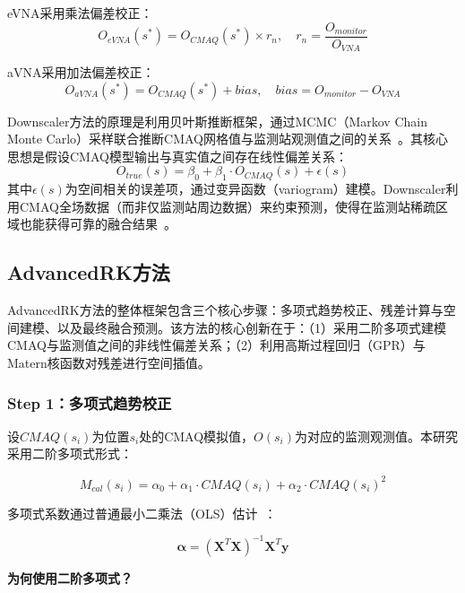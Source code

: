 \documentclass[UTF8, a4paper, 12pt]{article}
\begin{document}
eVNA采用乘法偏差校正：
\begin{equation}
O_{eVNA}(s^*) = O_{CMAQ}(s^*) \times r_n, \quad r_n = \frac{O_{monitor}}{O_{VNA}}
\end{equation}

aVNA采用加法偏差校正：
\begin{equation}
O_{aVNA}(s^*) = O_{CMAQ}(s^*) + bias, \quad bias = O_{monitor} - O_{VNA}
\end{equation}

 Downscaler方法的原理是利用贝叶斯推断框架，通过MCMC（Markov Chain Monte Carlo）采样联合推断CMAQ网格值与监测站观测值之间的关系~\cite{rodriguez2025downscaling}。其核心思想是假设CMAQ模型输出与真实值之间存在线性偏差关系：
\begin{equation}
O_{true}(s) = \beta_0 + \beta_1 \cdot O_{CMAQ}(s) + \epsilon(s)
\end{equation}
其中$\epsilon(s)$为空间相关的误差项，通过变异函数（variogram）建模。Downscaler利用CMAQ全场数据（而非仅监测站周边数据）来约束预测，使得在监测站稀疏区域也能获得可靠的融合结果~\cite{foley2010CMAQ}。

\subsection{AdvancedRK方法}

AdvancedRK方法的整体框架包含三个核心步骤：多项式趋势校正、残差计算与空间建模、以及最终融合预测。该方法的核心创新在于：（1）采用二阶多项式建模CMAQ与监测值之间的非线性偏差关系；（2）利用高斯过程回归（GPR）与Matern核函数对残差进行空间插值。

\subsubsection{Step 1：多项式趋势校正}

设$CMAQ(s_i)$为位置$s_i$处的CMAQ模拟值，$O(s_i)$为对应的监测观测值。本研究采用二阶多项式形式：

\begin{equation}
M_{cal}(s_i) = \alpha_0 + \alpha_1 \cdot CMAQ(s_i) + \alpha_2 \cdot CMAQ(s_i)^2
\end{equation}

多项式系数通过普通最小二乘法（OLS）估计~\cite{rasmussen2006gaussian}：

\begin{equation}
\boldsymbol{\alpha} = (\mathbf{X}^T \mathbf{X})^{-1} \mathbf{X}^T \mathbf{y}
\end{equation}

\textbf{为何使用二阶多项式？}
\end{document}
